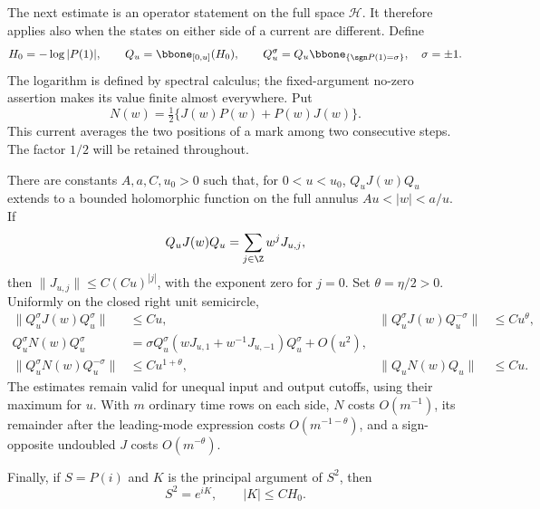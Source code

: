 The next estimate is an operator statement on the full space
$\mathcal H$.  It therefore applies also when the states on either side
of a current are different.  Define
\[
 H_0=-\log|P(1)|,\qquad Q_u=\bbone_{[0,u]}(H_0),\qquad
 Q_u^\sigma=Q_u\bbone_{\{\sgn P(1)=\sigma\}},\quad \sigma=\pm1.
\]
The logarithm is defined by spectral calculus; the fixed-argument
no-zero assertion makes its value finite almost everywhere.  Put
\begin{equation}\label{eq:angular-N-definition}
 N(w)=\tfrac12\{J(w)P(w)+P(w)J(w)\}.
\end{equation}
This current averages the two positions of a mark among two consecutive
steps.  The factor $1/2$ will be retained throughout.

\begin{lemma}\label{lem:low-band}
There are constants $A,a,C,u_0>0$ such that, for $0<u<u_0$,
$Q_uJ(w)Q_u$ extends to a bounded holomorphic function on the full
annulus $Au<|w|<a/u$.  If
\begin{equation}\label{eq:angular-Laurent}
 Q_uJ(w)Q_u=\sum_{j\in\Z}w^j J_{u,j},
\end{equation}
then $\|J_{u,j}\|\le C(Cu)^{|j|}$, with the exponent zero for $j=0$.
Set $\theta=\eta/2>0$.  Uniformly on the closed right unit semicircle,
\begin{align}
 \|Q_u^\sigma J(w)Q_u^\sigma\|&\le Cu,
 &\|Q_u^\sigma J(w)Q_u^{-\sigma}\|&\le Cu^\theta,
 \label{eq:angular-J-bands}\\
 Q_u^\sigma N(w)Q_u^\sigma
 &=\sigma Q_u^\sigma(wJ_{u,1}+w^{-1}J_{u,-1})Q_u^\sigma+O(u^2),
 \label{eq:angular-N-leading}\\
 \|Q_u^\sigma N(w)Q_u^{-\sigma}\|&\le Cu^{1+\theta},
 &\|Q_uN(w)Q_u\|&\le Cu.
 \label{eq:angular-N-bands}
\end{align}
The estimates remain valid for unequal input and output cutoffs, using
their maximum for $u$.  With $m$ ordinary time rows on each side,
$N$ costs $O(m^{-1})$, its remainder after the leading-mode expression
costs $O(m^{-1-\theta})$, and a sign-opposite undoubled $J$ costs
$O(m^{-\theta})$.

Finally, if $S=P(i)$ and $K$ is the principal argument of $S^2$, then
\begin{equation}\label{eq:angular-phase-bound}
 S^2=e^{iK},\qquad |K|\le C H_0.
\end{equation}
\end{lemma}

